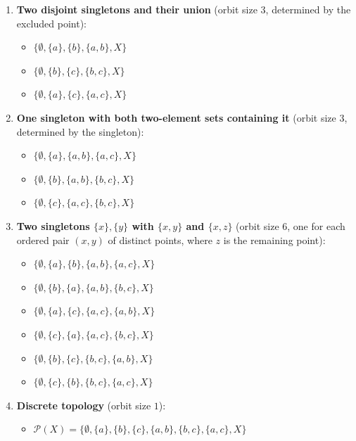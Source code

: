 \documentclass[12pt]{article}
\begin{document}
\begin{enumerate}
    \item \textbf{Two disjoint singletons and their union} (orbit size $3$, determined by the excluded point):
    \begin{itemize}
        \item $\{\emptyset, \{a\}, \{b\}, \{a,b\}, X\}$
        \item $\{\emptyset, \{b\}, \{c\}, \{b,c\}, X\}$
        \item $\{\emptyset, \{a\}, \{c\}, \{a,c\}, X\}$
    \end{itemize}

    \item \textbf{One singleton with both two-element sets containing it} (orbit size $3$, determined by the singleton):
    \begin{itemize}
        \item $\{\emptyset, \{a\}, \{a,b\}, \{a,c\}, X\}$
        \item $\{\emptyset, \{b\}, \{a,b\}, \{b,c\}, X\}$
        \item $\{\emptyset, \{c\}, \{a,c\}, \{b,c\}, X\}$
    \end{itemize}

    \item \textbf{Two singletons $\{x\},\{y\}$ with $\{x,y\}$ and $\{x,z\}$} (orbit size $6$, one for each ordered pair $(x,y)$ of distinct points, where $z$ is the remaining point):
    \begin{itemize}
        \item $\{\emptyset, \{a\}, \{b\}, \{a,b\}, \{a,c\}, X\}$
        \item $\{\emptyset, \{b\}, \{a\}, \{a,b\}, \{b,c\}, X\}$
        \item $\{\emptyset, \{a\}, \{c\}, \{a,c\}, \{a,b\}, X\}$
        \item $\{\emptyset, \{c\}, \{a\}, \{a,c\}, \{b,c\}, X\}$
        \item $\{\emptyset, \{b\}, \{c\}, \{b,c\}, \{a,b\}, X\}$
        \item $\{\emptyset, \{c\}, \{b\}, \{b,c\}, \{a,c\}, X\}$
    \end{itemize}

    \item \textbf{Discrete topology} (orbit size $1$):
    \begin{itemize}
        \item $\mathcal{P}(X) = \{\emptyset, \{a\}, \{b\}, \{c\}, \{a,b\}, \{b,c\}, \{a,c\}, X\}$
    \end{itemize}
\end{enumerate}
\end{document}
